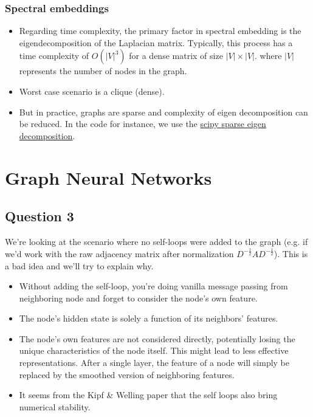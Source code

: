 \documentclass[a4paper]{article}
\begin{document}
\subsubsection*{Spectral embeddings}
\begin{itemize}
\item  Regarding time complexity, the primary factor in spectral embedding is the eigendecomposition of the Laplacian matrix. 
Typically, this process has a time complexity of $O(|V|^3)$ for a dense matrix of size $|V| \times |V|$.
where $ |V| $ represents the number of nodes in the graph.
\item  Worst case scenario is a clique (dense).
\item But in practice, graphs are sparse and complexity of eigen decomposition can be reduced.
In the code for instance, 
we use the \href{https://docs.scipy.org/doc/scipy/reference/generated/scipy.sparse.linalg.eigs.html}{scipy sparse eigen decomposition}.
\end{itemize}
\break

\section{Graph Neural Networks}
\subsection*{Question 3}


We're looking at the scenario where no self-loops were added to the graph (e.g. if we'd work with the raw adjacency matrix after normalization
$D^{-\frac{1}{2}} A D^{-\frac{1}{2}}$). This is a bad idea and we'll try to explain why.
\begin{itemize}
    \item Without adding the self-loop, you're doing vanilla message passing from neighboring node and forget to consider the node's own feature.
    \item The node's hidden state is solely a function of its neighbors' features.
    \item The node's own features are not considered directly, potentially losing the unique characteristics of the node itself. 
    This might lead to less effective representations.  After a single layer, the feature of a node will simply 
    be replaced by the smoothed version of neighboring features.
    \item It seems from the Kipf \& Welling paper \cite{kipf2017semisupervised} that the self loops also bring numerical stability.
\end{itemize}
\end{document}
